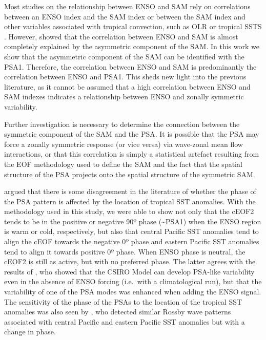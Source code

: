 \documentclass[pdflatex,lineno,sn-basic]{sn-jnl}
\theoremstyle{thmstyleone}%
\theoremstyle{thmstyletwo}%
\theoremstyle{thmstylethree}%
\begin{document}
Most studies on the relationship between ENSO and SAM rely on correlations between an ENSO index and the SAM index \citep[e.g.][\citet{cai2011a}]{lheureux2006} or between the SAM index and other variables associated with tropical convection, such as OLR or tropical SSTS \citep[e.g.][]{carvalho2005}.
However, \citet{campitelli2022} showed that the correlation between ENSO and SAM is almost completely explained by the asymmetric component of the SAM.
In this work we show that the asymmetric component of the SAM can be identified with the PSA1.
Therefore, the correlation between ENSO and SAM is predominantly the correlation between ENSO and PSA1.
This sheds new light into the previous literature, as it cannot be assumed that a high correlation between ENSO and SAM indexes indicates a relationship between ENSO and zonally symmetric variability.

Further investigation is necessary to determine the connection between the symmetric component of the SAM and the PSA.
It is possible that the PSA may force a zonally symmetric response (or vice versa) via wave-zonal mean flow interactions, or that this correlation is simply a statistical artefact resulting from the EOF methodology used to define the SAM and the fact that the spatial structure of the PSA projects onto the spatial structure of the symmetric SAM.

\citet{irving2016} argued that there is some disagreement in the literature of whether the phase of the PSA pattern is affected by the location of tropical SST anomalies.
With the methodology used in this study, we were able to show not only that the cEOF2 tends to be in the positive or negative 90º phase (\textasciitilde PSA1) when the ENSO region is warm or cold, respectively, but also that central Pacific SST anomalies tend to align the cEOF towards the negative 0º phase and eastern Pacific SST anomalies tend to align it towards positive 0º phase.
When ENSO phase is neutral, the cEOF2 is still as active, but with no preferred phase.
The latter agrees with the results of \citet{cai2002}, who showed that the CSIRO Model can develop PSA-like variability even in the absence of ENSO forcing (i.e.~with a climatological run), but that the variability of one of the PSA modes was enhanced when adding the ENSO signal.
The sensitivity of the phase of the PSAs to the location of the tropical SST anomalies was also seen by \citet{ciasto2015}, who detected similar Rossby wave patterns associated with central Pacific and eastern Pacific SST anomalies but with a change in phase.
\end{document}

